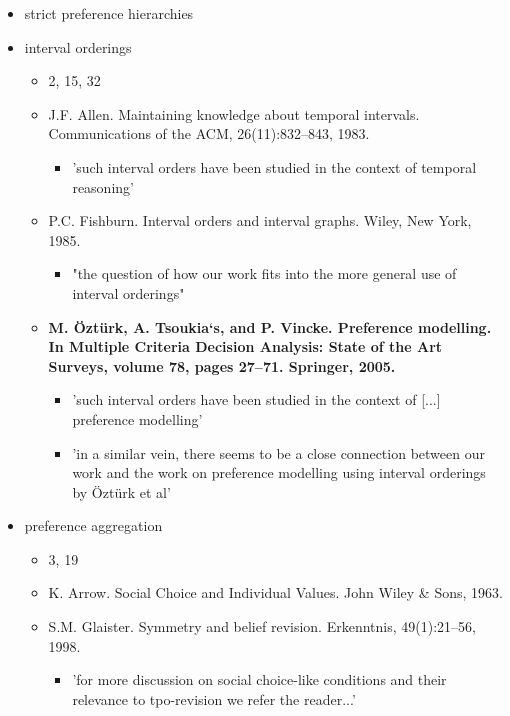\documentclass[11pt]{article}
\begin{document}
\begin{itemize}
\begin{itemize}
    \end{itemize}
    \item strict preference hierarchies
    \item interval orderings
    \begin{itemize}
        \item 2, 15, 32
        \item J.F. Allen. Maintaining knowledge about temporal intervals. Communications of the ACM, 26(11):832–843, 1983.
        \begin{itemize}
            \item 'such interval orders have been studied in the context of temporal reasoning'
        \end{itemize}
        \item P.C. Fishburn. Interval orders and interval graphs. Wiley, New York, 1985.
        \begin{itemize}
            \item "the question of how our work fits into the more general use of interval orderings"
        \end{itemize}
        \item \textbf{M. Öztürk, A. Tsoukia`s, and P. Vincke. Preference modelling. In Multiple Criteria Decision Analysis: State of the Art Surveys, volume 78, pages 27–71. Springer, 2005.}
        \begin{itemize}
            \item 'such interval orders have been studied in the context of [...] preference modelling'
            \item 'in a similar vein, there seems to be a close connection between our work and the work on preference modelling using interval orderings by Öztürk et al'
        \end{itemize}
    \end{itemize}
    \item preference aggregation
    \begin{itemize}
        \item 3, 19
        \item K. Arrow. Social Choice and Individual Values. John Wiley \& Sons, 1963.
        \item S.M. Glaister. Symmetry and belief revision. Erkenntnis, 49(1):21–56, 1998.
        \begin{itemize}
            \item 'for more discussion on social choice-like conditions and their relevance to tpo-revision we refer the reader...'
        \end{itemize}
    \end{itemize}
\end{itemize}
\end{document}
